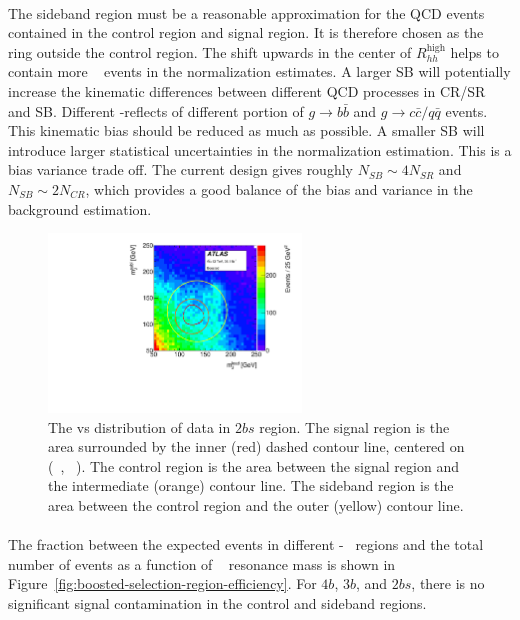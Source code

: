 \paragraph{}
The sideband region must be a reasonable approximation for the QCD events contained in the control region and signal region.
It is therefore chosen as the ring outside the control region.
The shift upwards in the center of $R_{hh}^{\text{high}}$ helps to contain more \ttbar~ events in the normalization estimates.
A larger SB will potentially increase the kinematic differences between different QCD processes in CR/SR and SB.
Different \mleadJ-\msublJ reflects of different portion of $g \to b\bar{b}$ and $g \to c\bar{c}/q\bar{q}$ events.
This kinematic bias should be reduced as much as possible.
A smaller SB will introduce larger statistical uncertainties in the normalization estimation.
This is a bias variance trade off.
The current design gives roughly $N_{SB} \sim 4 N_{SR}$ and $N_{SB} \sim 2 N_{CR}$, which provides a good balance of the bias and variance in the background estimation.

\begin{figure}[htbp!]
\begin{center}
  \includegraphics[width=0.6\textwidth,angle=-90]{figures/boosted/Other/TwoTag_split_Incl_data_mH0H1.pdf}
  \caption{The \mleadJ vs \msublJ distribution of data in $2bs$ region. The signal region is the area surrounded by the inner (red) dashed contour line, centered on (~\GeV, ~\GeV). The control region is the area between the signal region and the intermediate (orange) contour line. The sideband region is the area between the control region and the outer (yellow) contour line.}
  \label{fig:boosted-region-def}
\end{center}
\end{figure}

\paragraph{}
The fraction between the expected events in different \mleadJ-\msublJ~ regions and the total number of events as a function of \Grav~ resonance mass is shown in Figure~\ref{fig:boosted-selection-region-efficiency}. 
For $4b$, $3b$, and $2bs$, there is no significant signal contamination in the control and sideband regions.


